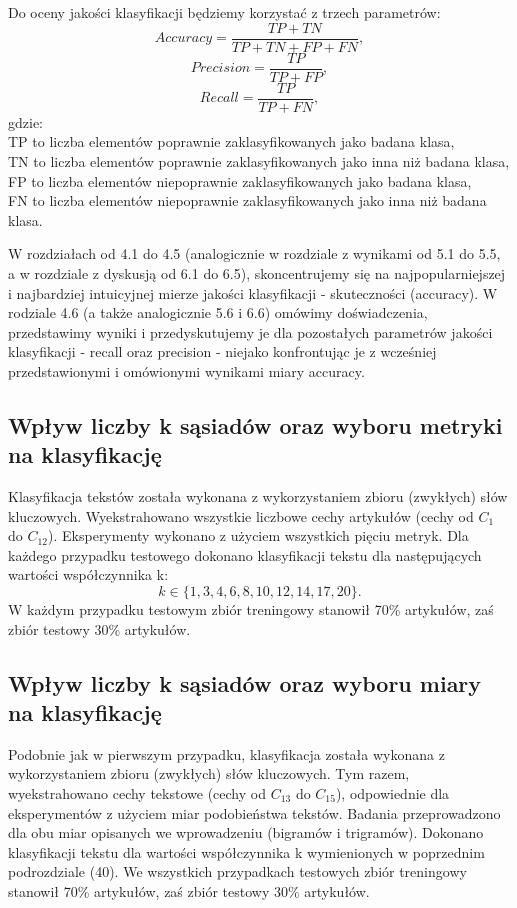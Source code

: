 \documentclass{classrep}
\begin{document}
Do oceny jakości klasyﬁkacji będziemy korzystać z trzech parametrów:
\begin{equation}
         Accuracy = \frac{TP + TN}{TP + TN + FP + FN},
 \end{equation}	
\begin{equation}
	Precision = \frac{TP}{TP + FP},
\end{equation}	
\begin{equation}
	Recall = \frac{TP}{TP + FN},
\end{equation}
gdzie:\\
\quad TP to liczba elementów poprawnie zaklasyﬁkowanych jako badana klasa,\\
\quad TN to liczba elementów poprawnie zaklasyﬁkowanych jako inna niż badana klasa,\\
\quad FP to liczba elementów niepoprawnie zaklasyﬁkowanych jako badana klasa,\\
\quad FN to liczba elementów niepoprawnie zaklasyﬁkowanych jako inna niż badana klasa.\newline

W rozdziałach od 4.1 do 4.5 (analogicznie w rozdziale z wynikami od 5.1 do 5.5, a w rozdziale z dyskusją od 6.1 do 6.5), skoncentrujemy się na najpopularniejszej i najbardziej intuicyjnej mierze jakości klasyfikacji - skuteczności (accuracy). W rodziale 4.6 (a także analogicznie 5.6 i 6.6) omówimy doświadczenia, przedstawimy wyniki i przedyskutujemy je dla pozostałych parametrów jakości klasyfikacji - recall oraz precision - niejako konfrontując je z wcześniej przedstawionymi i omówionymi wynikami miary accuracy.


\subsection{Wpływ liczby k sąsiadów oraz wyboru metryki na klasyfikację}
Klasyfikacja tekstów została wykonana z wykorzystaniem zbioru (zwykłych) słów kluczowych. Wyekstrahowano wszystkie liczbowe cechy artykułów (cechy od $C_1$ do $C_{12}$). Eksperymenty wykonano z użyciem wszystkich pięciu metryk. Dla każdego przypadku testowego dokonano klasyfikacji tekstu dla następujących wartości współczynnika k:
\begin{equation}
            k \in \{1, 3, 4, 6, 8, 10, 12, 14, 17, 20\}.
 \end{equation}
W każdym przypadku testowym zbiór treningowy stanowił 70\% artykułów, zaś zbiór testowy 30\% artykułów.

\subsection{Wpływ liczby k sąsiadów oraz wyboru miary na klasyfikację}
Podobnie jak w pierwszym przypadku, klasyfikacja została wykonana z wykorzystaniem zbioru (zwykłych) słów kluczowych. Tym razem, wyekstrahowano cechy tekstowe (cechy od $C_{13}$ do $C_{15}$), odpowiednie dla eksperymentów z użyciem miar podobieństwa tekstów. Badania przeprowadzono dla obu miar opisanych we wprowadzeniu (bigramów i trigramów). Dokonano klasyfikacji tekstu dla wartości współczynnika k wymienionych w poprzednim podrozdziale (40). We wszystkich przypadkach testowych zbiór treningowy stanowił 70\% artykułów, zaś zbiór testowy 30\% artykułów.
\end{document}
